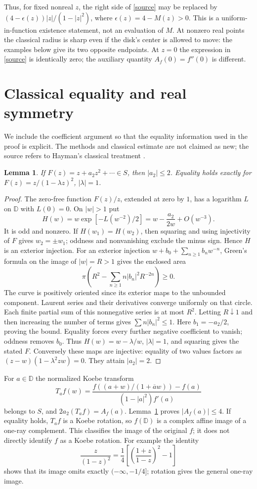 \documentclass[11pt]{article}
\newtheorem{lemma}[theorem]{Lemma}
\newcommand{\D}{\mathbb D}
\newcommand{\cl}[1]{\overline{#1}}
\begin{document}
Thus, for fixed nonreal $z$, the right side of \eqref{source} may be replaced by
$(4-\epsilon(z))|z|/(1-|z|^2)$, where $\epsilon(z)=4-M(z)>0$.
This is a uniform-in-function existence statement, not an evaluation of $M$.
At nonzero real points the classical radius is sharp even if the disk's center
is allowed to move: the examples below give its two opposite endpoints.
At $z=0$ the expression in \eqref{source} is identically zero; the auxiliary
quantity $A_f(0)=f''(0)$ is different.

\section{Classical equality and real symmetry}
We include the coefficient argument so that the equality information used in
the proof is explicit. The methods and classical estimate are not claimed as
new; the source refers to Hayman's classical treatment \cite{Hayman}.

\begin{lemma}\label{coefficient}
If $F(z)=z+a_2z^2+\cdots\in S$, then $|a_2|\le2$.
Equality holds exactly for $F(z)=z/(1-\lambda z)^2$, $|\lambda|=1$.
\end{lemma}
\begin{proof}
The zero-free function $F(z)/z$, extended at zero by $1$, has a logarithm $L$
on $\D$ with $L(0)=0$. On $|w|>1$ put
\[
 H(w)=w\exp[-L(w^{-2})/2]=w-\frac{a_2}{2w}+O(w^{-3}).
\]
It is odd and nonzero. If $H(w_1)=H(w_2)$, then squaring and using injectivity
of $F$ gives $w_2=\pm w_1$; oddness and nonvanishing exclude the minus sign.
Hence $H$ is an exterior injection.
For an exterior injection $w+b_0+\sum_{n\ge1}b_nw^{-n}$, Green's formula on
the image of $|w|=R>1$ gives the enclosed area
\[
 \pi\left(R^2-\sum_{n\ge1}n|b_n|^2R^{-2n}\right)\ge0.
\]
The curve is positively oriented since its exterior maps to the unbounded
component. Laurent series and their derivatives converge uniformly on that
circle. Each finite partial sum of this nonnegative series is at most $R^2$.
Letting $R\downarrow1$ and then increasing the number of terms gives
$\sum n|b_n|^2\le1$.
Here $b_1=-a_2/2$, proving the bound. Equality forces every further negative
coefficient to vanish; oddness removes $b_0$. Thus $H(w)=w-\lambda/w$,
$|\lambda|=1$, and squaring gives the stated $F$.
Conversely these maps are injective: equality of two values factors as
$(z-w)(1-\lambda^2zw)=0$. They attain $|a_2|=2$.
\end{proof}

For $a\in\D$ the normalized Koebe transform
\[
 T_af(w)=\frac{f((a+w)/(1+\cl a w))-f(a)}{(1-|a|^2)f'(a)}
\]
belongs to $S$, and $2a_2(T_af)=A_f(a)$. Lemma~\ref{coefficient} proves
$|A_f(a)|\le4$. If equality holds, $T_af$ is a Koebe rotation, so
$f(\D)$ is a complex affine image of a one-ray complement. This classifies
the image of the original $f$; it does not directly identify $f$ as a Koebe
rotation. For example the identity
\[
 \frac{z}{(1-z)^2}
 =\frac14\left[\left(\frac{1+z}{1-z}\right)^2-1\right]
\]
shows that its image omits exactly $(-\infty,-1/4]$; rotation gives the
general one-ray image.
\end{document}
